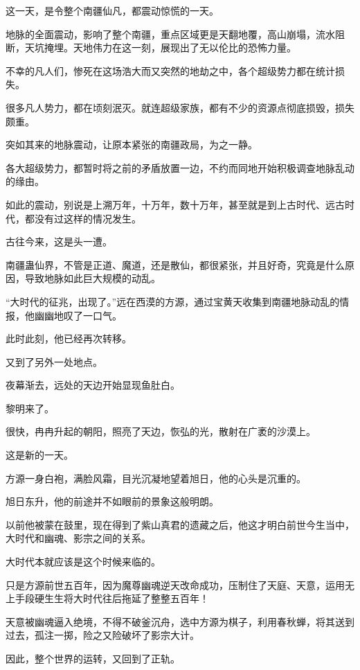 
\begin{this_body}

这一天，是令整个南疆仙凡，都震动惊慌的一天。

地脉的全面震动，影响了整个南疆，重点区域更是天翻地覆，高山崩塌，流水阻断，天坑掩埋。天地伟力在这一刻，展现出了无以伦比的恐怖力量。

不幸的凡人们，惨死在这场浩大而又突然的地劫之中，各个超级势力都在统计损失。

很多凡人势力，都在顷刻泯灭。就连超级家族，都有不少的资源点彻底损毁，损失颇重。

突如其来的地脉震动，让原本紧张的南疆政局，为之一静。

各大超级势力，都暂时将之前的矛盾放置一边，不约而同地开始积极调查地脉乱动的缘由。

如此的震动，别说是上溯万年，十万年，数十万年，甚至就是到上古时代、远古时代，都没有过这样的情况发生。

古往今来，这是头一遭。

南疆蛊仙界，不管是正道、魔道，还是散仙，都很紧张，并且好奇，究竟是什么原因，导致地脉如此巨大规模的动乱。

“大时代的征兆，出现了。”远在西漠的方源，通过宝黄天收集到南疆地脉动乱的情报，他幽幽地叹了一口气。

此时此刻，他已经再次转移。

又到了另外一处地点。

夜幕渐去，远处的天边开始显现鱼肚白。

黎明来了。

很快，冉冉升起的朝阳，照亮了天边，恢弘的光，散射在广袤的沙漠上。

这是新的一天。

方源一身白袍，满脸风霜，目光沉凝地望着旭日，他的心头是沉重的。

旭日东升，他的前途并不如眼前的景象这般明朗。

以前他被蒙在鼓里，现在得到了紫山真君的遗藏之后，他这才明白前世今生当中，大时代和幽魂、影宗之间的关系。

大时代本就应该是这个时候来临的。

只是方源前世五百年，因为魔尊幽魂逆天改命成功，压制住了天庭、天意，运用无上手段硬生生将大时代往后拖延了整整五百年！

天意被幽魂逼入绝境，不得不破釜沉舟，选中方源为棋子，利用春秋蝉，将其送到过去，孤注一掷，险之又险破坏了影宗大计。

因此，整个世界的运转，又回到了正轨。


\end{this_body}
